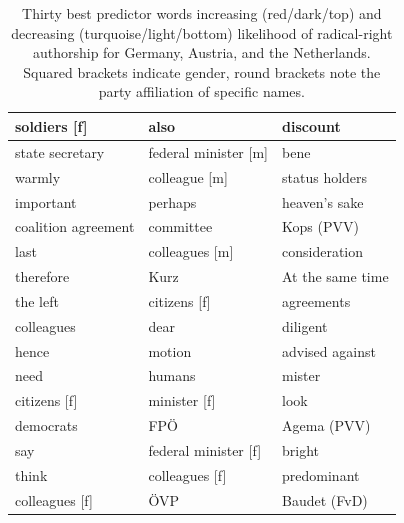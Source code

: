 \documentclass{article}
\begin{document}
\begin{table}[ht!]
\begin{tabular}{|l|l|l|}
\rowcolor[HTML]{c41200} 
\cellcolor[HTML]{00BFC4}soldiers {[}f{]} & also                        & discount                 \\ \hline
\rowcolor[HTML]{c41200} 
\cellcolor[HTML]{00BFC4}state secretary  & federal minister {[}m{]}            & bene                     \\ \hline
\rowcolor[HTML]{c41200} 
\cellcolor[HTML]{00BFC4}warmly           & colleague {[}m{]}           & status holders           \\ \hline
\rowcolor[HTML]{c41200} 
\cellcolor[HTML]{00BFC4}important        & perhaps                     & heaven’s sake            \\ \hline
\rowcolor[HTML]{00BFC4} 
coalition agreement                      & \cellcolor[HTML]{c41200}committee & Kops {(}PVV{)}           \\ \hline
\rowcolor[HTML]{00BFC4} 
last                                     & colleagues {[}m{]}          & consideration            \\ \hline
\rowcolor[HTML]{00BFC4} 
therefore                                & Kurz                        & At the same time         \\ \hline
\rowcolor[HTML]{00BFC4} 
the left                                 & citizens {[}f{]}            & agreements               \\ \hline
\rowcolor[HTML]{00BFC4} 
colleagues                               & dear                        & diligent                 \\ \hline
\rowcolor[HTML]{00BFC4} 
hence                                    & motion                      & advised against          \\ \hline
\rowcolor[HTML]{00BFC4} 
need                                     & humans                      & mister                   \\ \hline
\rowcolor[HTML]{00BFC4} 
citizens {[}f{]}                         & minister {[}f{]}            & look                     \\ \hline
\rowcolor[HTML]{00BFC4} 
democrats                                & FPÖ                         & Agema {(}PVV{)}          \\ \hline
\rowcolor[HTML]{00BFC4} 
say                                      & federal minister {[}f{]}                      & bright                   \\ \hline
\rowcolor[HTML]{00BFC4} 
think                                    & colleagues {[}f{]}          & predominant              \\ \hline
\rowcolor[HTML]{00BFC4} 
colleagues {[}f{]}                       & ÖVP                         & Baudet {(}FvD{)}         \\ \hline
\end{tabular}
\caption{Thirty best predictor words increasing (red/dark/top) and decreasing (turquoise/light/bottom) likelihood of radical-right authorship for Germany, Austria, and the Netherlands. Squared brackets indicate gender, round brackets note the party affiliation of specific names.}
\label{tab:bpws}
\end{table}
\end{document}

